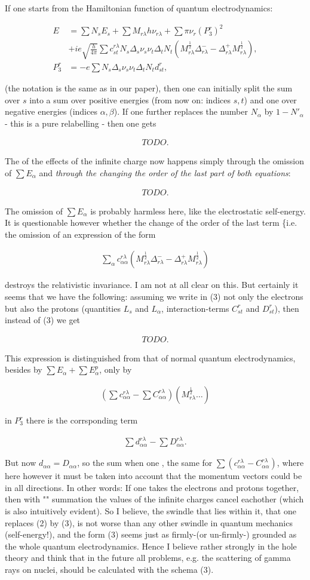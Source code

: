 \documentclass{article}
\newcommand{\nequ}[2]{
\begin{align*}
#1
\tag{#2}
\end{align*}
}
\newcommand{\uequ}[1]{
\begin{align*}
#1
\end{align*}
}
\newcommand{\sumX}[1]{\underset{#1}{\sum}}
\begin{document}
If one starts from the Hamiltonian function of quantum electrodynamics:
\nequ{
E&=\sum{N_s E_s} + \sum{M_{r\lambda}h\nu_{r\lambda}} + \sum{\pi\nu_r(P^r_3)^2}\\
 &+ ie\sqrt{\frac{h}{4\pi}} \sum{c^{r\lambda}_{st} N_s \Delta_s \nu_s \nu_t \Delta_t N_t(
   M^{\frac{1}{2}}_{r\lambda}\Delta^{-}_{r\lambda} -
   \Delta^{+}_{r\lambda}M^{\frac{1}{2}}_{r\lambda})},\\
P^r_3 &= -e\sum{N_s \Delta_s \nu_s \nu_t \Delta_t N_t d^r_{st}},
}{1}
(the notation is the same as in our paper), then one can initially split the sum over $s$ into a sum over positive energies (from now on: indices $s,t$) and one over negative energies (indices $\alpha,\beta$). If one further replaces the number $N_\alpha$ by $1-N'_\alpha$ - this is a pure relabelling - then one gets
\nequ{
TODO.
}{2}
The  of the effects of the infinite charge now happens simply through the omission of $\sum{E_\alpha}$ and \textit{through the changing the order of the last part of both equations}:
\nequ{
TODO.
}{3}
The omission of $\sum{E_\alpha}$ is probably harmless here, like the electrostatic self-energy. It is questionable however whether the change of the order of the last term \{i.e. the omission of an expression of the form
\uequ{
\sumX{\alpha}c^{r\lambda}_{\alpha\alpha}(
  M^{\frac{1}{2}}_{r\lambda}\Delta^{-}_{r\lambda} -
  \Delta^{+}_{r\lambda}M^{\frac{1}{2}}_{r\lambda})
}
destroys the relativistic invariance. I am not at all clear on this. But certainly it seems that we have the following: assuming we write in (3) not only the electrons but also the protons (quantities $L_s$ and $L_\alpha$, interaction-terms $C^r_{st}$ and $D^r_{st}$), then instead of (3) we get
\nequ{
TODO.
}{4}
This expression is distinguished from that of normal quantum electrodynamics, besides by $\sum{E_\alpha} + \sum{E^p_\alpha}$, only by
\uequ{
\left(\sum{c^{r\lambda}_{\alpha\alpha}} - \sum{C^{r\lambda}_{\alpha\alpha}}
\right)\left(M^{\frac{1}{2}}_{r\lambda} \dots \right)
}
in $P^r_3$ there is the corrsponding term
\uequ{
\sum{d^{r\lambda}_{\alpha\alpha}} - \sum{D^{r\lambda}_{\alpha\alpha}}.
}
But now $d_{\alpha\alpha}=D_{\alpha\alpha}$, so the sum  when one , the same for $\sum{\left(c^{r\lambda}_{\alpha\alpha} - C^{r\lambda}_{\alpha\alpha}\right)}$, where here however it must be taken into account that the momentum vectors could be in all directions. In other words: If one takes the electrons and protons together, then with "" summation the values of the infinite charges cancel eachother (which is also intuitively evident). So I believe, the swindle that lies within it, that one replaces (2) by (3), is not worse than any other swindle in quantum mechanics (self-energy!), and the form (3) seems just as firmly-(or un-firmly-) grounded as the whole quantum electrodynamics. Hence I believe rather strongly in the hole theory and think that in the future all problems, e.g. the scattering of gamma rays on nuclei, should be calculated with the schema (3).
\end{document}
